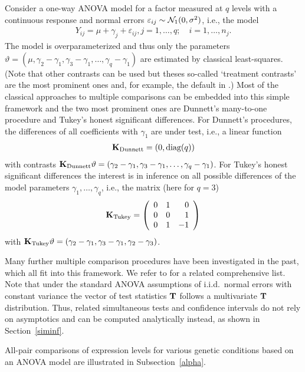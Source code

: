 \documentclass[12pt]{article}
\begin{document}
Consider a one-way ANOVA model for a factor measured at $q$ levels
with a continuous response and normal errors $\varepsilon_{ij} \sim \mathcal{N}_1(0, \sigma^2)$, 
i.e., the model
\begin{eqnarray*}
Y_{ij} = \mu + \gamma_{j} + \varepsilon_{ij}, j = 1,\dots,q; \quad i = 1, \dots, n_j.
\end{eqnarray*}
The model is overparameterized and thus only the parameters
$\vartheta = (\mu, \gamma_2 - \gamma_1, \gamma_3 - \gamma_1, \dots, \gamma_q -
\gamma_1)$ 
are  estimated by classical least-squares. (Note that other contrasts can be used
but theses so-called `treatment contrasts' are the most prominent ones and,
for example, the default in \RR.) 
Most of the classical approaches
to multiple comparisons can be embedded into this simple framework and 
the two most prominent ones are Dunnett's many-to-one procedure and
Tukey's honest significant differences. For Dunnett's procedures,
the differences of all coefficients with $\gamma_1$ are under test, i.e.,
a linear function
\begin{eqnarray*}
\mathbf{K}_\text{Dunnett} = (0, \text{diag}(q))
\end{eqnarray*}
with contrasts
$\mathbf{K}_\text{Dunnett} \vartheta = (\gamma_2 - \gamma_1, \gamma_3 - \gamma_1, \dots,
\gamma_q - \gamma_1)$.
For Tukey's honest significant differences the interest is in inference on
all possible differences of the model parameters $\gamma_1, \dots, \gamma_q$, i.e., 
the matrix (here for $q = 3$)
\begin{eqnarray*}
\mathbf{K}_\text{Tukey} = \left( 
\begin{array}{rrr} 0 & 1 & 0 \\
0 & 0 & 1 \\
0 & 1 & -1 
\end{array} \right)
\end{eqnarray*}
with $\mathbf{K}_\text{Tukey} \vartheta = (\gamma_2 - \gamma_1, \gamma_3 - \gamma_1,
\gamma_2 - \gamma_3)$.

Many further multiple comparison procedures have been investigated in the past, 
which all fit into this framework. We refer to \cite{BretzGenzHothorn2001} for a related 
comprehensive list. Note that under the standard ANOVA assumptions of
i.i.d.~normal errors with constant variance the vector of test statistics $\mathbf{T}$ 
follows a multivariate $\mathbf{T}$ distribution. Thus, related simultaneous tests and 
confidence intervals do not rely on asymptotics and can be computed analytically 
instead, as shown in Section~\ref{siminf}.

All-pair comparisons of expression levels for various genetic conditions 
based on an ANOVA model are illustrated in Subsection~\ref{alpha}.
\end{document}
